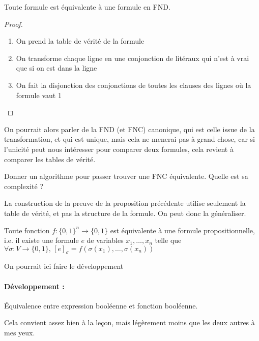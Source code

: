 \begin{proposition}
	Toute formule est équivalente à une formule en FND.
\end{proposition}
\begin{proof}
	\begin{enumerate}
		\item On prend la table de vérité de la formule
		\item On transforme chaque ligne en une conjonction de litéraux qui n'est à vrai que si on est dans la ligne
		\item On fait la disjonction des conjonctions de toutes les clauses des lignes où la formule vaut 1
	\end{enumerate}
\end{proof}

\begin{com}
	On pourrait alors parler de la FND (et FNC) canonique, qui est celle issue de la transformation, et qui est unique, mais cela ne menerai pas à grand chose, car si l'unicité peut nous intéresser pour comparer deux formules, cela revient à comparer les tables de vérité.
\end{com}

\begin{exercise}
	Donner un algorithme pour passer trouver une FNC équivalente. Quelle est sa complexité ?
\end{exercise}

La construction de la preuve de la proposition précédente utilise seulement la table de vérité, et pas la structure de la formule. On peut donc la généraliser.

\begin{theorem}
	\label{33-equiv}
	Toute fonction $f : \{0, 1\}^n \to \{0, 1\}$ est équivalente à une formule propositionnelle, i.e. il existe une formule $e$ de variables $x_1, \dots, x_n$ telle que $\forall \sigma : V \to \{0, 1\}, \, [e]_\sigma = f(\sigma(x_1), \dots, \sigma(x_n))$
\end{theorem}

\begin{com}
	On pourrait ici faire le développement \paragraph{Développement :} Équivalence entre expression booléenne et fonction booléenne.
	
	Cela convient assez bien à la leçon, mais légèrement moins que les deux autres à mes yeux.
\end{com}


